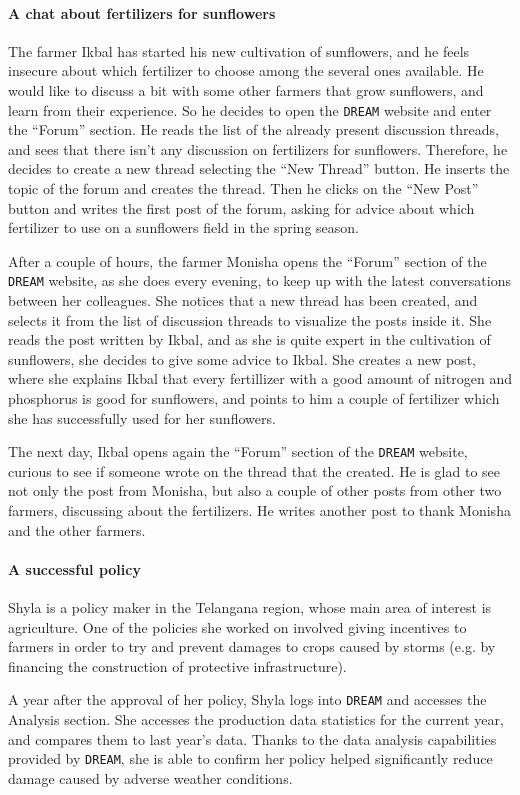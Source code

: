 \documentclass{article}
\begin{document}
\paragraph{A chat about fertilizers for sunflowers}
The farmer Ikbal has started his new cultivation of sunflowers, and he feels insecure about which fertilizer to choose among the several ones available. He would like to discuss a bit with some other farmers that grow sunflowers, and learn from their experience. So he decides to open the \verb|DREAM| website and enter the “Forum” section. He reads the list of the already present discussion threads, and sees that there isn’t any discussion on fertilizers for sunflowers. Therefore, he decides to create a new thread selecting the “New Thread” button. He inserts the topic of the forum and creates the thread. Then he clicks on the “New Post” button and writes the first post of the forum, asking for advice about which fertilizer to use on a sunflowers field in the spring season.\par
\noindent
After a couple of hours, the farmer Monisha opens the “Forum” section of the \verb|DREAM| website, as she does every evening, to keep up with the latest conversations between her colleagues. She notices that a new thread has been created, and selects it from the list of discussion threads to visualize the posts inside it. She reads the post written by Ikbal, and as she is quite expert in the cultivation of sunflowers, she decides to give some advice to Ikbal. She creates a new post, where she explains Ikbal that every fertillizer with a good amount of nitrogen and phosphorus is good for sunflowers, and points to him a couple of fertilizer which she has successfully used for her sunflowers.\par
\noindent
The next day, Ikbal opens again the “Forum” section of the \verb|DREAM| website, curious to see if someone wrote on the thread that the created. He is glad to see not only the post from Monisha, but also a couple of other posts from other two farmers, discussing about the fertilizers. He writes another post to thank Monisha and the other farmers.

\paragraph{A successful policy}
Shyla is a policy maker in the Telangana region, whose main area of interest is agriculture. One of the policies she worked on involved giving incentives to farmers in order to try and prevent damages to crops caused by storms (e.g. by financing the construction of protective infrastructure).\par
\noindent A year after the approval of her policy, Shyla logs into \verb|DREAM| and accesses the Analysis section. She accesses the production data statistics for the current year, and compares them to last year's data. Thanks to the data analysis capabilities provided by \verb|DREAM|, she is able to confirm her policy helped significantly reduce damage caused by adverse weather conditions.
\end{document}
